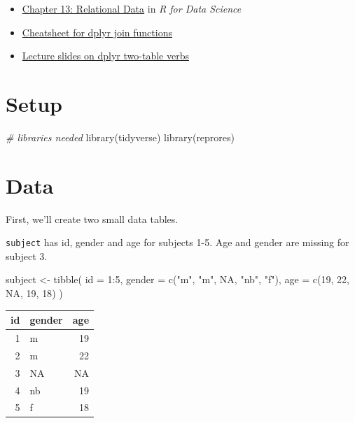\documentclass[
  oneside]{book}
\newenvironment{Shaded}{\begin{snugshade}}{\end{snugshade}}
\newcommand{\AttributeTok}[1]{\textcolor[rgb]{0.77,0.63,0.00}{#1}}
\newcommand{\CommentTok}[1]{\textcolor[rgb]{0.56,0.35,0.01}{\textit{#1}}}
\newcommand{\ConstantTok}[1]{\textcolor[rgb]{0.00,0.00,0.00}{#1}}
\newcommand{\DecValTok}[1]{\textcolor[rgb]{0.00,0.00,0.81}{#1}}
\newcommand{\FunctionTok}[1]{\textcolor[rgb]{0.00,0.00,0.00}{#1}}
\newcommand{\NormalTok}[1]{#1}
\newcommand{\OtherTok}[1]{\textcolor[rgb]{0.56,0.35,0.01}{#1}}
\newcommand{\SpecialCharTok}[1]{\textcolor[rgb]{0.00,0.00,0.00}{#1}}
\newcommand{\StringTok}[1]{\textcolor[rgb]{0.31,0.60,0.02}{#1}}
\providecommand{\tightlist}{%
  \setlength{\itemsep}{0pt}\setlength{\parskip}{0pt}}
\begin{document}
\begin{itemize}
\tightlist
\item
  \href{http://r4ds.had.co.nz/relational-data.html}{Chapter 13: Relational Data} in \emph{R for Data Science}
\item
  \href{http://stat545.com/bit001_dplyr-cheatsheet.html}{Cheatsheet for dplyr join functions}
\item
  \href{slides/05_joins_slides.pdf}{Lecture slides on dplyr two-table verbs}
\end{itemize}

\hypertarget{setup-joins}{%
\section{Setup}\label{setup-joins}}

\begin{Shaded}
\begin{Highlighting}[]
\CommentTok{\# libraries needed}
\FunctionTok{library}\NormalTok{(tidyverse)}
\FunctionTok{library}\NormalTok{(reprores)}
\end{Highlighting}
\end{Shaded}

\hypertarget{data-1}{%
\section{Data}\label{data-1}}

First, we'll create two small data tables.

\texttt{subject} has id, gender and age for subjects 1-5. Age and gender are missing for subject 3.

\begin{Shaded}
\begin{Highlighting}[]
\NormalTok{subject }\OtherTok{\textless{}{-}} \FunctionTok{tibble}\NormalTok{(}
  \AttributeTok{id =} \DecValTok{1}\SpecialCharTok{:}\DecValTok{5}\NormalTok{,}
  \AttributeTok{gender =} \FunctionTok{c}\NormalTok{(}\StringTok{"m"}\NormalTok{, }\StringTok{"m"}\NormalTok{, }\ConstantTok{NA}\NormalTok{, }\StringTok{"nb"}\NormalTok{, }\StringTok{"f"}\NormalTok{),}
  \AttributeTok{age =} \FunctionTok{c}\NormalTok{(}\DecValTok{19}\NormalTok{, }\DecValTok{22}\NormalTok{, }\ConstantTok{NA}\NormalTok{, }\DecValTok{19}\NormalTok{, }\DecValTok{18}\NormalTok{)}
\NormalTok{)}
\end{Highlighting}
\end{Shaded}

\begin{tabular}{r|l|r}
\hline
id & gender & age\\
\hline
1 & m & 19\\
\hline
2 & m & 22\\
\hline
3 & NA & NA\\
\hline
4 & nb & 19\\
\hline
5 & f & 18\\
\hline
\end{tabular}
\end{document}

